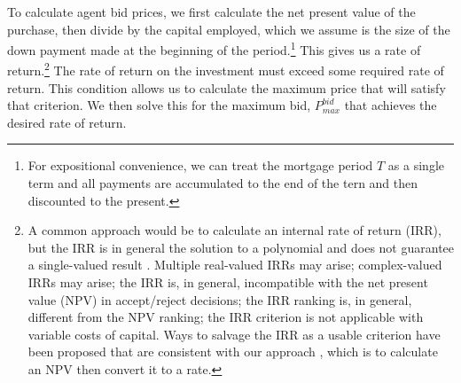 {%


To calculate agent bid prices, we first calculate the net present value of the purchase, then divide by the capital employed, which we assume is the size of the down payment made at the beginning of the period.\footnote{For expositional convenience, we can treat the mortgage period $T$ as a single term and all payments are accumulated to the end of the tern and then discounted to the present.} 
 This gives us a rate of return.\footnote{A common approach would be to calculate an internal rate of return (IRR), but  the IRR is in general the solution to a polynomial and does not guarantee a single-valued result \cite{robinsonOptimalTerminationIRR1996}. Multiple real-valued  IRRs may arise;  complex-valued IRRs may arise;  the IRR is, in general, incompatible with the net present value (NPV) in accept/reject decisions; the IRR ranking is, in general, different from the NPV ranking; the IRR criterion is not applicable with variable costs of capital. Ways to salvage the IRR as a usable criterion have been proposed that are consistent with our approach \cite{magniAverageInternalRate2010}, which is to calculate an NPV then convert it to a rate.} 
The rate of return on the investment must exceed some required rate of return. This condition allows us to calculate the maximum price that will satisfy that criterion.
We then solve this for  the maximum bid, $P_{max}^{bid}$ that achieves the desired rate of return. 

}
